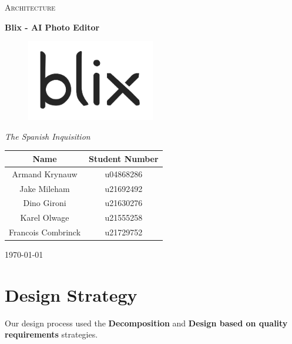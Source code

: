 \documentclass[11pt,a4paper]{article}
\begin{document}
\begin{titlepage}
	\centering
    {\scshape\LARGE Architecture\par}
    \vspace{1.5cm}
    {\huge\bfseries Blix - AI Photo Editor\par}
    \begin{figure}[h]
        \centering %
        \includegraphics[width=0.5\textwidth]{../pics/blix.png}
    \end{figure}
    \vspace{2.5cm}
    {\Large\itshape The Spanish Inquisition\par}
	\begin{tabular}{|c|c|}
		\hline
		\textbf{Name} 		& \textbf{Student Number} \\
		\hline
		Armand Krynauw		& u04868286  \\
		Jake Mileham		& u21692492  \\
		Dino Gironi			& u21630276  \\
		Karel Olwage		& u21555258  \\
		Francois Combrinck	& u21729752  \\
		\hline
	\end{tabular}
    \vfill
    {\large \today\par}
\end{titlepage}

\tableofcontents
\pagebreak


\section*{Design Strategy}
Our design process used the \textbf{Decomposition} and \textbf{Design based on quality requirements} strategies.
\end{document}
